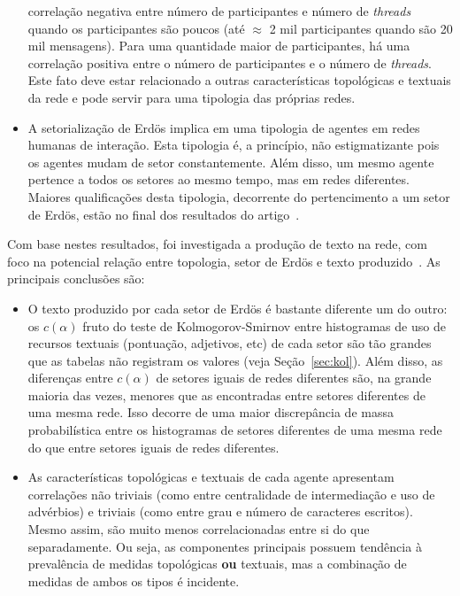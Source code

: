 \documentclass[a4paper,openright,12pt]{report} %
\begin{document}
\begin{itemize}
    correlação negativa entre número de participantes e número de \emph{threads} quando os participantes são poucos 
    (até $\approx$ 2 mil participantes quando são 20 mil mensagens).
    Para uma quantidade maior de participantes,
    há uma correlação positiva entre o número de participantes e o número de \emph{threads}.
    Este fato deve estar relacionado a outras características topológicas e textuais da rede e 
    pode servir para uma tipologia das próprias redes.
    \item A setorialização de Erdös implica em uma
        tipologia de agentes em redes humanas de interação.
        Esta tipologia é, a princípio, não estigmatizante pois os agentes mudam de setor constantemente.
        Além disso, um mesmo agente pertence a todos os setores ao mesmo tempo, mas em redes diferentes.
        Maiores qualificações desta tipologia, decorrente do pertencimento
	a um setor de Erdös, estão no final dos resultados do artigo~\cite{timeS}.
\end{itemize}

Com base nestes resultados, foi investigada a produção de texto na rede,
com foco na potencial relação entre topologia,
setor de Erdös e texto produzido~\cite{rcText}.
As principais conclusões são:
\begin{itemize}
    \item O texto produzido por cada setor de Erdös é bastante diferente um do outro:
        os $c(\alpha)$ fruto do teste de Kolmogorov-Smirnov
        entre histogramas
        de uso de recursos textuais (pontuação, adjetivos, etc) de cada setor
        são tão grandes que as tabelas não registram os valores (veja Seção~\ref{sec:kol}).
        Além disso, as diferenças entre $c(\alpha)$ de setores iguais de redes diferentes são,
        na grande maioria das vezes, menores que as encontradas entre setores diferentes de uma mesma rede.
        Isso decorre de uma maior discrepância de massa probabilística entre os histogramas de setores diferentes de uma mesma rede do que entre setores iguais de redes diferentes. 

    \item As características topológicas e textuais de cada agente apresentam correlações não triviais (como entre centralidade de intermediação e uso de advérbios) e triviais (como entre grau e número de caracteres escritos).
        Mesmo assim, são muito menos correlacionadas entre si do que separadamente. Ou seja, as componentes principais possuem tendência
        à prevalência de medidas topológicas {\bf ou} textuais,
        mas a combinação de medidas de ambos os tipos é incidente.
\end{itemize}
\end{document}
